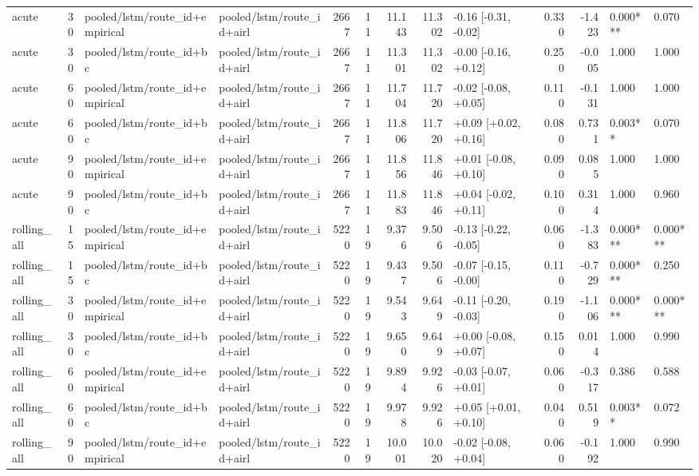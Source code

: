 \begin{tabular}{lrllrrrrlrrll}
acute & 30 & pooled/lstm/route_id+empirical & pooled/lstm/route_id+airl & 2667 & 11 & 11.143 & 11.302 & -0.16 [-0.31, -0.02] & 0.330 & -1.423 & 0.000*** & 0.070 \\
acute & 30 & pooled/lstm/route_id+bc & pooled/lstm/route_id+airl & 2667 & 11 & 11.301 & 11.302 & -0.00 [-0.16, +0.12] & 0.250 & -0.005 & 1.000 & 1.000 \\
acute & 60 & pooled/lstm/route_id+empirical & pooled/lstm/route_id+airl & 2667 & 11 & 11.704 & 11.720 & -0.02 [-0.08, +0.05] & 0.110 & -0.131 & 1.000 & 1.000 \\
acute & 60 & pooled/lstm/route_id+bc & pooled/lstm/route_id+airl & 2667 & 11 & 11.806 & 11.720 & +0.09 [+0.02, +0.16] & 0.080 & 0.731 & 0.003** & 0.070 \\
acute & 90 & pooled/lstm/route_id+empirical & pooled/lstm/route_id+airl & 2667 & 11 & 11.856 & 11.846 & +0.01 [-0.08, +0.10] & 0.090 & 0.085 & 1.000 & 1.000 \\
acute & 90 & pooled/lstm/route_id+bc & pooled/lstm/route_id+airl & 2667 & 11 & 11.883 & 11.846 & +0.04 [-0.02, +0.11] & 0.100 & 0.314 & 1.000 & 0.960 \\
rolling_all & 15 & pooled/lstm/route_id+empirical & pooled/lstm/route_id+airl & 5220 & 19 & 9.376 & 9.506 & -0.13 [-0.22, -0.05] & 0.060 & -1.383 & 0.000*** & 0.000*** \\
rolling_all & 15 & pooled/lstm/route_id+bc & pooled/lstm/route_id+airl & 5220 & 19 & 9.437 & 9.506 & -0.07 [-0.15, -0.00] & 0.110 & -0.729 & 0.000*** & 0.250 \\
rolling_all & 30 & pooled/lstm/route_id+empirical & pooled/lstm/route_id+airl & 5220 & 19 & 9.543 & 9.649 & -0.11 [-0.20, -0.03] & 0.190 & -1.106 & 0.000*** & 0.000*** \\
rolling_all & 30 & pooled/lstm/route_id+bc & pooled/lstm/route_id+airl & 5220 & 19 & 9.650 & 9.649 & +0.00 [-0.08, +0.07] & 0.150 & 0.014 & 1.000 & 0.990 \\
rolling_all & 60 & pooled/lstm/route_id+empirical & pooled/lstm/route_id+airl & 5220 & 19 & 9.894 & 9.926 & -0.03 [-0.07, +0.01] & 0.060 & -0.317 & 0.386 & 0.588 \\
rolling_all & 60 & pooled/lstm/route_id+bc & pooled/lstm/route_id+airl & 5220 & 19 & 9.978 & 9.926 & +0.05 [+0.01, +0.10] & 0.040 & 0.519 & 0.003** & 0.072 \\
rolling_all & 90 & pooled/lstm/route_id+empirical & pooled/lstm/route_id+airl & 5220 & 19 & 10.001 & 10.020 & -0.02 [-0.08, +0.04] & 0.060 & -0.192 & 1.000 & 0.990 \\

\end{tabular}
